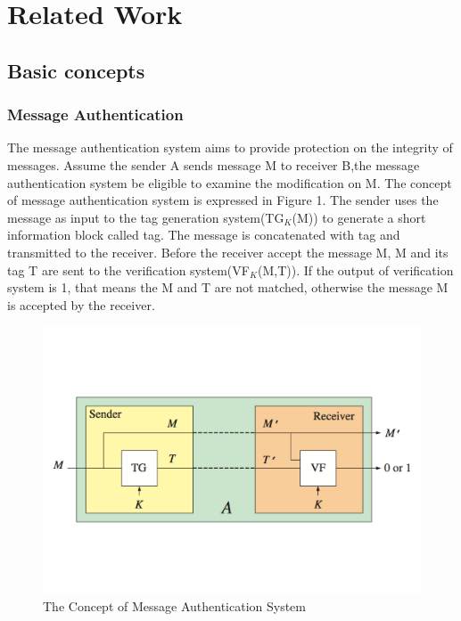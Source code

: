 \documentclass{article}
\begin{document}
\section{Related Work}
\subsection{Basic concepts}
\subsubsection{Message Authentication}
The message authentication system aims to provide protection on the integrity of messages. Assume the sender A sends message M to receiver B,the message authentication system be eligible to examine the modification on M. The concept of message authentication system is expressed in Figure 1. The sender uses the message as input to the tag generation system(TG$_K$(M)) to generate a short information block called tag. The message is concatenated with tag and transmitted to the receiver. Before the receiver accept the message M, M and its tag T are sent to the verification system(VF$_K$(M,T)). If the output of verification system is 1, that means the M and T are not matched, otherwise the message M is accepted by the receiver. 
\begin{figure}[htbp]
\centering
\includegraphics[scale=0.4]{./diagram/ma.pdf}
\caption{The Concept of Message Authentication System}
\label{fig:1 }
\end{figure}
\end{document}
